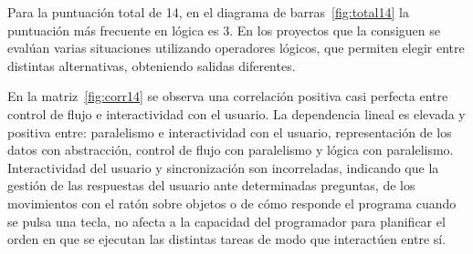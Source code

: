 \documentclass[a4paper, 12pt]{book}
\begin{document}
Para la puntuación total de 14, en el diagrama de barras~\ref{fig:total14} la puntuación más frecuente en lógica es 3. En los proyectos que la consiguen 
se evalúan varias situaciones utilizando operadores lógicos, que permiten elegir entre distintas alternativas, obteniendo salidas diferentes.

En la matriz~\ref{fig:corr14} se observa una correlación positiva casi perfecta entre control de flujo e interactividad con el usuario. La dependencia lineal es elevada y positiva entre: paralelismo e interactividad con el usuario, representación de los datos con abstracción, control de flujo con paralelismo y lógica con paralelismo. Interactividad del usuario y sincronización son incorreladas, indicando que la gestión de las respuestas del usuario ante determinadas preguntas, de los movimientos con el ratón sobre objetos o de cómo responde el programa cuando se pulsa una tecla, no afecta a la capacidad del programador para planificar el orden en que se ejecutan las distintas tareas de modo que interactúen entre sí.
\end{document}
